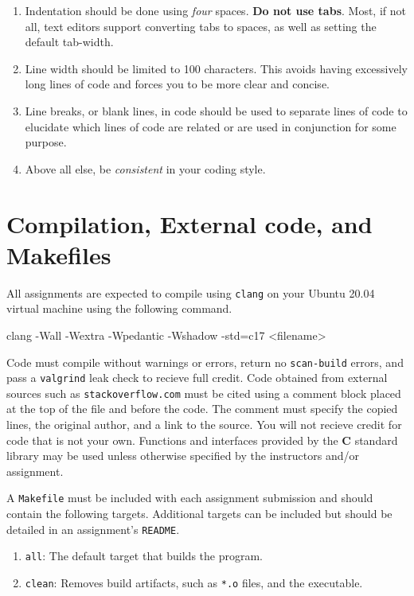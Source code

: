 \documentclass[11pt]{article}
\begin{document}
\begin{enumerate}
  \item Indentation should be done using \emph{four} spaces. \textbf{Do not use tabs}.
    Most, if not all, text editors support converting tabs to spaces, as well as
    setting the default tab-width.

  \item Line width should be limited to 100 characters. This avoids having
    excessively long lines of code and forces you to be more clear and concise.

  \item Line breaks, or blank lines, in code should be used to separate lines of
    code to elucidate which lines of code are related or are used in conjunction
    for some purpose.

  \item Above all else, be \emph{consistent} in your coding style.
\end{enumerate}


\section{Compilation, External code, and Makefiles}

All assignments are expected to compile using \texttt{clang} on your Ubuntu
20.04 virtual machine using the following command. 

\begin{codelisting}{}
clang -Wall -Wextra -Wpedantic -Wshadow -std=c17 <filename>
\end{codelisting}

\noindent Code must compile without warnings or errors, return no
\texttt{scan-build} errors, and pass a \texttt{valgrind} leak check to recieve
full credit.
Code obtained from external sources such as \texttt{stackoverflow.com} must be
cited using a comment block placed at the top of the file and before the code. The comment must specify
the copied lines, the original author, and a link to the source. You will not
recieve credit for code that is not your own. Functions and interfaces provided
by the \textbf{C} standard library may be used unless otherwise specified by the
instructors and/or assignment.

A \texttt{Makefile} must be included with each assignment submission and should
contain the following targets.  Additional targets can be included but should be
detailed in an assignment's \texttt{README}.
\begin{enumerate}
  \item \texttt{all}: The default target that builds the program.
  \item \texttt{clean}: Removes build artifacts, such as \texttt{*.o} files, and the executable.
\end{enumerate}
\end{document}
